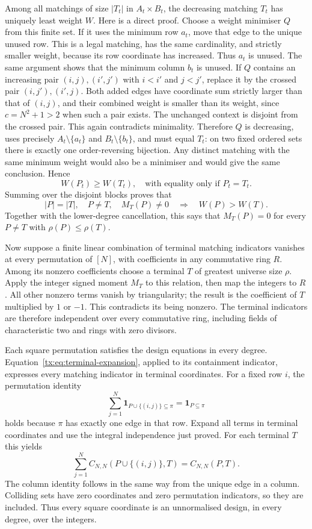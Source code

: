 \documentclass[11pt,a4paper,oneside,openany]{book}
\theoremstyle{definition}\newtheorem{definition}[theorem]{Definition}
\theoremstyle{remark}\newtheorem{remark}[theorem]{Remark}
\numberwithin{equation}{chapter}
\begin{document}
Among all matchings of size $|T_t|$ in $A_t\times B_t$, the decreasing
matching $T_t$ has uniquely least weight $W$.  Here is a direct proof.
Choose a weight minimiser $Q$ from this finite set.  If it uses the
minimum row $a_t$, move that edge to the unique unused row.  This is a
legal matching, has the same cardinality, and strictly smaller weight,
because its row coordinate has increased.  Thus $a_t$ is unused.
The same argument shows that the minimum column $b_t$ is unused.
If $Q$ contains an increasing pair $(i,j),(i',j')$ with
$i<i'$ and $j<j'$, replace it by the crossed pair
$(i,j'),(i',j)$.  Both added edges have coordinate sum strictly larger
than that of $(i,j)$, and their combined weight is smaller than its
weight, since $c=N^2+1>2$ when such a pair exists.  The unchanged context
is disjoint from the crossed pair.  This again contradicts minimality.
Therefore $Q$ is decreasing, uses precisely $A_t\setminus\{a_t\}$
and $B_t\setminus\{b_t\}$, and must equal $T_t$: on two fixed ordered
sets there is exactly one order-reversing bijection.  Any distinct
matching with the same minimum weight would also be a minimiser and
would give the same conclusion.  Hence
\[
 W(P_t)\geq W(T_t),\quad\text{with equality only if }P_t=T_t.
\]
Summing over the disjoint blocks proves that
\[
 |P|=|T|,\quad P\ne T,\quad M_T(P)\ne0
 \quad\Longrightarrow\quad W(P)>W(T).
\]
Together with the lower-degree cancellation, this says that $M_T(P)=0$
for every $P\ne T$ with $\rho(P)\leq\rho(T)$.

Now suppose a finite linear combination of terminal matching indicators
vanishes at every permutation of $[N]$, with coefficients in any
commutative ring $R$.  Among its nonzero coefficients choose a terminal
$T$ of greatest universe size $\rho$.  Apply the integer signed moment $M_T$ to
this relation, then map the integers to $R$.  All other nonzero terms
vanish by triangularity; the result is the coefficient of $T$ multiplied
by $1$ or $-1$.  This contradicts its being nonzero.  The terminal
indicators are therefore independent over every commutative ring,
including fields of characteristic two and rings with zero divisors.

Each square permutation satisfies the design equations in every degree.
Equation~\eqref{tx:eq:terminal-expansion}, applied to its containment
indicator, expresses every matching indicator in terminal coordinates.
For a fixed row $i$, the permutation identity
\[
 \sum_{j=1}^{N}\boldsymbol{1}_{P\cup\{(i,j)\}\subseteq\pi}
       =\boldsymbol{1}_{P\subseteq\pi}
\]
holds because $\pi$ has exactly one edge in that row.  Expand all terms
in terminal coordinates and use the integral independence just proved.
For each terminal $T$ this yields
\[
 \sum_{j=1}^{N}C_{N,N}(P\cup\{(i,j)\},T)=C_{N,N}(P,T).
\]
The column identity follows in the same way from the unique edge in a
column.  Colliding sets have zero coordinates and zero permutation
indicators, so they are included.  Thus every square coordinate is an
unnormalised design, in every degree, over the integers.
\end{document}
